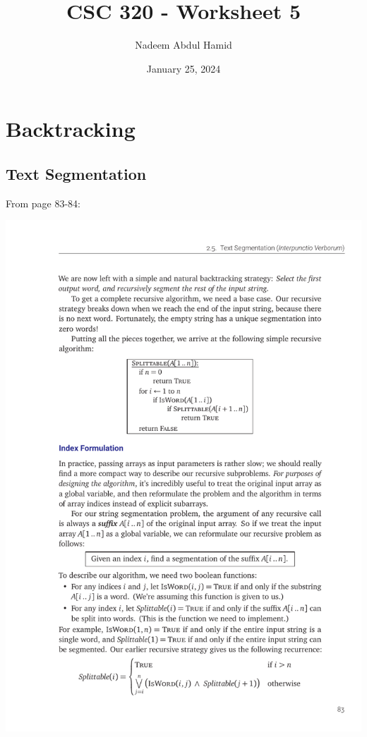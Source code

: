 \documentclass[12pt]{article}
\title{CSC 320 - Worksheet 5}
\author{Nadeem Abdul Hamid}
\date{January 25, 2024}
\begin{document}
\section{Backtracking}

\subsection{Text Segmentation}

From page 83-84:

\includegraphics{w05-splittable.pdf}
\end{document}
